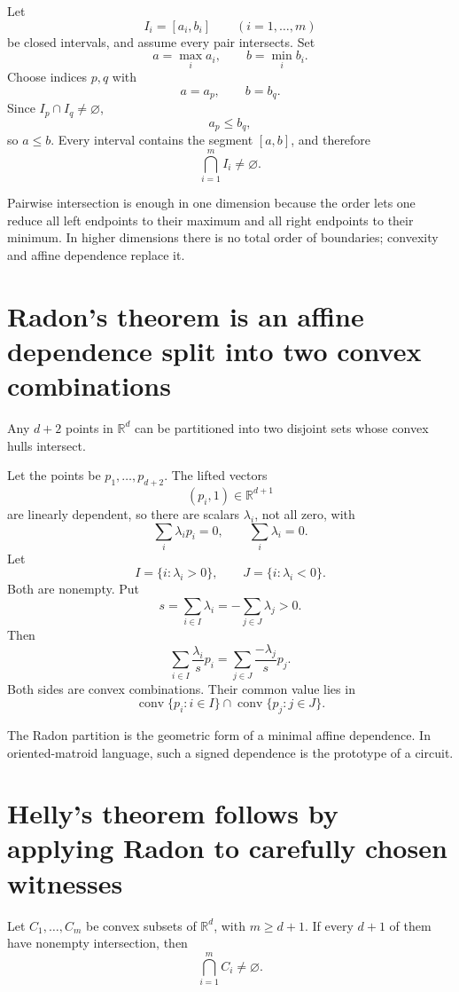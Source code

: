 Let
\[
  I_i=[a_i,b_i]
  \qquad(i=1,\ldots,m)
\]
be closed intervals, and assume every pair intersects.  Set
\[
  a=\max_i a_i,
  \qquad
  b=\min_i b_i.
\]
Choose indices \(p,q\) with
\[
  a=a_p,
  \qquad
  b=b_q.
\]
Since \(I_p\cap I_q\ne\varnothing\),
\[
  a_p\le b_q,
\]
so \(a\le b\).  Every interval contains the segment \([a,b]\), and therefore
\[
  \bigcap_{i=1}^m I_i\ne\varnothing.
\]

Pairwise intersection is enough in one dimension because the order lets one reduce all left endpoints to their maximum and all right endpoints to their minimum.  In higher dimensions there is no total order of boundaries; convexity and affine dependence replace it.

\section{Radon's theorem is an affine dependence split into two convex combinations}

\begin{theorem}[Radon]
Any \(d+2\) points in \(\mathbb R^d\) can be partitioned into two disjoint sets whose convex hulls intersect.
\end{theorem}

Let the points be \(p_1,\ldots,p_{d+2}\).  The lifted vectors
\[
  (p_i,1)\in\mathbb R^{d+1}
\]
are linearly dependent, so there are scalars \(\lambda_i\), not all zero, with
\[
  \sum_i\lambda_i p_i=0,
  \qquad
  \sum_i\lambda_i=0.
\]
Let
\[
  I=\{i:\lambda_i>0\},
  \qquad
  J=\{i:\lambda_i<0\}.
\]
Both are nonempty.  Put
\[
  s=\sum_{i\in I}\lambda_i
  =-\sum_{j\in J}\lambda_j>0.
\]
Then
\[
  \sum_{i\in I}\frac{\lambda_i}{s}p_i
  =
  \sum_{j\in J}\frac{-\lambda_j}{s}p_j.
\]
Both sides are convex combinations.  Their common value lies in
\[
  \operatorname{conv}\{p_i:i\in I\}
  \cap
  \operatorname{conv}\{p_j:j\in J\}.
\]

The Radon partition is the geometric form of a minimal affine dependence.  In oriented-matroid language, such a signed dependence is the prototype of a circuit.

\section{Helly's theorem follows by applying Radon to carefully chosen witnesses}

\begin{theorem}
Let \(C_1,\ldots,C_m\) be convex subsets of \(\mathbb R^d\), with \(m\ge d+1\).  If every \(d+1\) of them have nonempty intersection, then
\[
  \bigcap_{i=1}^mC_i\ne\varnothing.
\]
\end{theorem}

